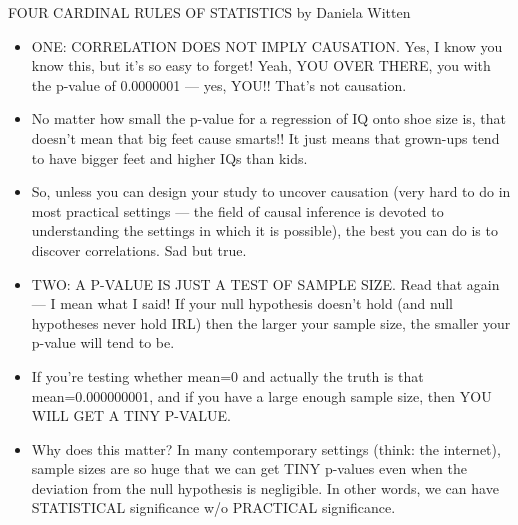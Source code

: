 \documentclass[handout]{beamer}
\begin{document}
\begin{frame}{FOUR CARDINAL RULES OF STATISTICS by Daniela Witten}
\scriptsize{
\begin{itemize}
 \item ONE:  CORRELATION DOES NOT IMPLY CAUSATION.  Yes, I know you know this, but it’s so easy to forget! Yeah, YOU OVER THERE, you with the p-value of 0.0000001 — yes, YOU!! That’s not causation.
 \item No matter how small the p-value for a regression of IQ onto shoe size is, that doesn’t mean that big feet cause smarts!!  It just means that grown-ups tend to have bigger feet and higher IQs than kids.
 \item So, unless you can design your study to uncover causation (very hard to do in most practical settings — the field of causal inference is devoted to understanding the settings in which it is possible), the best you can do is to discover correlations.  Sad but true.
 \item TWO:  A P-VALUE IS JUST A TEST OF SAMPLE SIZE.  Read that again — I mean what I said!  If your null hypothesis doesn't hold (and null hypotheses never hold IRL) then the larger your sample size, the smaller your p-value will tend to be.
 \item If you’re testing whether mean=0 and actually the truth is that mean=0.000000001, and if you have a large enough sample size, then YOU WILL GET A TINY P-VALUE.
 \item Why does this matter? In many contemporary settings (think: the internet), sample sizes are so huge that we can get TINY p-values even when the deviation from the null hypothesis is negligible. In other words, we can have STATISTICAL significance w/o PRACTICAL significance.
 \end{itemize}

} 
\end{frame}
\end{document}
